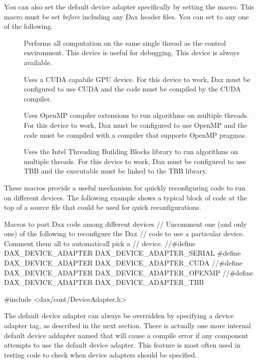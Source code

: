 You can also set the default device adapter specifically by setting the
 macro. This macro must be set \emph{before}
including any Dax header files. You can set 
to any one of the following.

\begin{description}
\item[] Performs all computation on
  the same single thread as the control environment. This device is useful
  for debugging. This device is always available.
\item[] Uses a CUDA capabile GPU
  device. For this device to work, Dax must be configured to use CUDA and
  the code must be compiled by the CUDA  compiler.
\item[] Uses OpenMP compiler
  extensions to run algorithms on multiple threads. For this device to
  work, Dax must be configured to use OpenMP and the code must be compiled
  with a compiler that supports OpenMP pragmas.
\item[] Uses the Intel Threading
  Building Blocks library to run algorithms on multiple threads. For this
  device to work, Dax must be configured to use TBB and the executable must
  be linked to the TBB library.
\end{description}

These macros provide a useful mechanism for quickly reconfiguring code to
run on different devices. The following example shows a typical block of
code at the top of a source file that could be used for quick
reconfigurations.

\begin{daxexample}{Macros to port Dax code among different devices}
// Uncomment one (and only one) of the following to reconfigure the Dax
// code to use a particular device. Comment them all to automaticall pick a
// device.
//#define DAX_DEVICE_ADAPTER DAX_DEVICE_ADAPTER_SERIAL
#define DAX_DEVICE_ADAPTER DAX_DEVICE_ADAPTER_CUDA
//#define DAX_DEVICE_ADAPTER DAX_DEVICE_ADAPTER_OPENMP
//#define DAX_DEVICE_ADAPTER DAX_DEVICE_ADAPTER_TBB

#include <dax/cont/DeviceAdapter.h>
\end{daxexample}

The default device adapter can always be overridden by specifying a device
adapter tag, as described in the next section. There is actually one more
internal default device addapter named
 that will cause a compile error if
any component attempts to use the default device adapter. This feature is
most often used in testing code to check when device adapters should be
specified.

